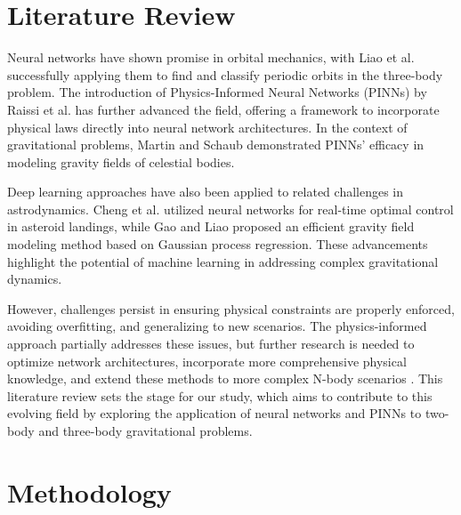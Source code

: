 \documentclass[11pt,a4paper, twocolumn]{article}
\begin{document}
\section{Literature Review}
\label{sec:literature}

Neural networks have shown promise in orbital mechanics, with Liao et al. \cite{liao2020} successfully applying them to find and classify periodic orbits in the three-body problem. The introduction of Physics-Informed Neural Networks (PINNs) by Raissi et al. \cite{raissi2019} has further advanced the field, offering a framework to incorporate physical laws directly into neural network architectures. In the context of gravitational problems, Martin and Schaub \cite{martin2022} demonstrated PINNs' efficacy in modeling gravity fields of celestial bodies.

Deep learning approaches have also been applied to related challenges in astrodynamics. Cheng et al. \cite{cheng2020} utilized neural networks for real-time optimal control in asteroid landings, while Gao and Liao \cite{gao2019} proposed an efficient gravity field modeling method based on Gaussian process regression. These advancements highlight the potential of machine learning in addressing complex gravitational dynamics.

However, challenges persist in ensuring physical constraints are properly enforced, avoiding overfitting, and generalizing to new scenarios. The physics-informed approach partially addresses these issues, but further research is needed to optimize network architectures, incorporate more comprehensive physical knowledge, and extend these methods to more complex N-body scenarios \cite{meng2022physics}. This literature review sets the stage for our study, which aims to contribute to this evolving field by exploring the application of neural networks and PINNs to two-body and three-body gravitational problems.
\section{Methodology}
\label{sec:methodology}
\end{document}
